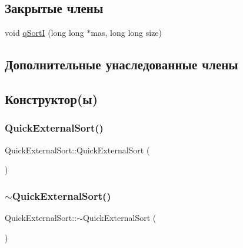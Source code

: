 \subsection*{Закрытые члены}
\begin{DoxyCompactItemize}
\item 
void \hyperlink{class_quick_external_sort_a912abb7f2ccdadd7d97992f035e16183}{q\+SortI} (long long $\ast$mas, long long size)
\end{DoxyCompactItemize}
\subsection*{Дополнительные унаследованные члены}


\subsection{Конструктор(ы)}
\hypertarget{class_quick_external_sort_ac31914e67af41c48b8fdcbcc076168ed}{}\label{class_quick_external_sort_ac31914e67af41c48b8fdcbcc076168ed} 
\subsubsection{\texorpdfstring{Quick\+External\+Sort()}{QuickExternalSort()}}
{\footnotesize\ttfamily Quick\+External\+Sort\+::\+Quick\+External\+Sort (\begin{DoxyParamCaption}{ }\end{DoxyParamCaption})}

\hypertarget{class_quick_external_sort_a370e2be5e7c4afc31f9b230c2ee4d689}{}\label{class_quick_external_sort_a370e2be5e7c4afc31f9b230c2ee4d689} 
\subsubsection{\texorpdfstring{$\sim$\+Quick\+External\+Sort()}{~QuickExternalSort()}}
{\footnotesize\ttfamily Quick\+External\+Sort\+::$\sim$\+Quick\+External\+Sort (\begin{DoxyParamCaption}{ }\end{DoxyParamCaption})}



